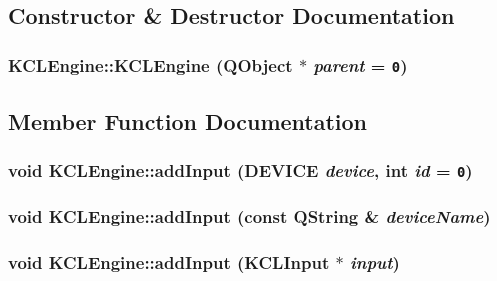 \subsection{Constructor \& Destructor Documentation}
\hypertarget{class_k_c_l_engine_fbe8d629ee92a2611f9971ed1bb718f3}{
\subsubsection[{KCLEngine}]{\setlength{\rightskip}{0pt plus 5cm}KCLEngine::KCLEngine (QObject $\ast$ {\em parent} = {\tt 0})}}
\label{class_k_c_l_engine_fbe8d629ee92a2611f9971ed1bb718f3}




\subsection{Member Function Documentation}
\hypertarget{class_k_c_l_engine_ef5bcdd289dcc543c61205707a1f39f1}{
\subsubsection[{addInput}]{\setlength{\rightskip}{0pt plus 5cm}void KCLEngine::addInput ({\bf DEVICE} {\em device}, \/  int {\em id} = {\tt 0})}}
\label{class_k_c_l_engine_ef5bcdd289dcc543c61205707a1f39f1}


\hypertarget{class_k_c_l_engine_f72512ac8f67ae93805301da15146b8d}{
\subsubsection[{addInput}]{\setlength{\rightskip}{0pt plus 5cm}void KCLEngine::addInput (const QString \& {\em deviceName})}}
\label{class_k_c_l_engine_f72512ac8f67ae93805301da15146b8d}


\hypertarget{class_k_c_l_engine_20f234eb6e418964d9d2d8e1b9332f4f}{
\subsubsection[{addInput}]{\setlength{\rightskip}{0pt plus 5cm}void KCLEngine::addInput ({\bf KCLInput} $\ast$ {\em input})}}
\label{class_k_c_l_engine_20f234eb6e418964d9d2d8e1b9332f4f}


